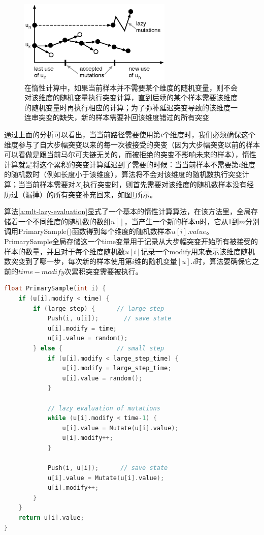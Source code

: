\begin{figure}
	\sidecaption
	\includegraphics[width=0.65\textwidth]{figures/mlt/lazy}
	\caption{在惰性计算中，如果当前样本并不需要某个维度的随机变量，则不会对该维度的随机变量执行突变计算，直到后续的某个样本需要该维度的随机变量时再执行相应的计算；为了弥补延迟突变导致的该维度一连串突变的缺失，新的样本需要补回该维度错过的所有突变}
	\label{f:mlt-lazy}
\end{figure}

通过上面的分析可以看出，当当前路径需要使用第$i$个维度时，我们必须确保这个维度参与了自大步幅突变以来的每一次被接受的突变（因为大步幅突变以前的样本可以看做是跟当前马尔可夫链无关的，而被拒绝的突变不影响未来的样本），惰性计算就是将这个累积的突变计算延迟到了需要的时候：当当前样本不需要第$i$维度的随机数时（例如长度小于该维度），算法将不会对该维度的随机数执行突变计算；当当前样本需要对$X_i$执行突变时，则首先需要对该维度的随机数样本没有经历过（漏掉）的所有突变补充回来，如图\ref{f:mlt-lazy}所示。

算法\ref{a:mlt-lazy-evaluation}显式了一个基本的惰性计算算法，在该方法里，全局存储着一个不同维度的随机数的数组$u[]$，当产生一个新的样本$\mathbf{u}$时，它从1到$m$分别调用PrimarySample()函数得到每个维度的随机数样本$u[i].value$。PrimarySample全局存储这一个time变量用于记录从大步幅突变开始所有被接受的样本的数量，并且对于每个维度随机数$u[i]$记录一个modify用来表示该维度随机数突变到了哪一步，每次新的样本使用第$i$维的随机变量$[u].i$时，算法要确保它之前的$time-modify$次累积突变需要被执行。

\begin{algorithm}
\begin{lstlisting}[language=C++, mathescape]
float PrimarySample(int i) { 
	if (u[i].modify < time) {
		if (large_step) {      // large step
			Push(i, u[i]);       // save state
			u[i].modify = time;
			u[i].value = random();
		} else {               // small step
			if (u[i].modify < large_step_time) {
				u[i].modify = large_step_time;
				u[i].value = random();
			}
			
			// lazy evaluation of mutations 
			while (u[i].modify < time-1) {
				u[i].value = Mutate(u[i].value);
				u[i].modify++;
			}
			
			Push(i, u[i]);      // save state
			u[i].value = Mutate(u[i].value);
			u[i].modify++;
		} 
	}
	return u[i].value;
}
\end{lstlisting}
\caption{获取每个原采样空间第$i$维的[0,1]随机变量的伪代码}
\label{a:mlt-lazy-evaluation}
\end{algorithm}

